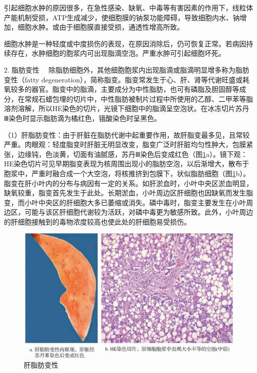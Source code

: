 引起细胞水肿的原因很多，在急性感染、缺氧、中毒等有害因素的作用下，线粒体产能机制受损，ATP生成减少，使细胞膜的钠泵功能障碍，导致细胞内水、钠增加，细胞水肿。或由于细胞膜直接受损，通透性增高所致。

细胞水肿是一种轻度或中度损伤的表现，在原因消除后，仍可恢复正常。若病因持续存在，水肿细胞的胞浆内可出现脂滴空泡。严重水肿可引起细胞坏死。

{2. 脂肪变性}
　除脂肪细胞外，其他细胞胞浆内出现脂滴或脂滴明显增多称为脂肪变性（fatty
degeneration），简称脂变。脂变常发生于心、肝、肾等代谢旺盛或耗氧较多的器官。脂变中的脂滴，主要成分为中性脂肪，也可有磷脂及胆固醇等成分，在常规石蜡包埋的切片中，中性脂肪被制片过程中所使用的乙醇、二甲苯等脂溶剂溶解，所以HE染色的切片，光镜下细胞中的脂滴呈空泡状。在冰冻切片苏丹Ⅲ染色时显示脂肪滴为橘红色，锇酸染色时呈黑色。

（1）肝脂肪变性：由于肝脏在脂肪代谢中起重要作用，故肝脂变最多见，且常较严重。肉眼观：轻度脂变时肝脏无明显改变，脂变广泛时肝脏均匀性肿大，包膜紧张，边缘钝，色淡黄，切面有油腻感，苏丹Ⅲ染色后变成红色（图\ref{fig1-8}a）。镜下观：HE染色切片可见早期脂变表现为核周围出现小的脂肪空泡，以后渐增大，散布于胞浆中，严重时融合成一个大空泡，将核推挤到包膜下，状似脂肪细胞（图\ref{fig1-8}b）。脂变在肝小叶内的分布与病因有一定的关系。如肝淤血时，小叶中央区淤血明显，缺氧较重，脂变首先发生于此处。长期淤血，小叶周边区肝细胞也因缺氧而发生脂变，而小叶中央区的肝细胞大多已萎缩或消失。磷中毒时，脂变主要发生在小叶周边区，可能与该区肝细胞代谢较为活跃，对磷中毒更为敏感所致。此外，小叶周边的肝细胞接触到的毒物浓度较高也使此处的肝细胞易受损伤。
\begin{figure}[!htbp]
	\centering
    \includegraphics{./images/Image00009.jpg}
	\caption{肝脂肪变性}
	\label{fig1-8} 
	\end{figure} 



